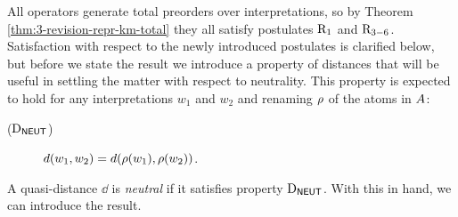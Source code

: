 All operators generate total preorders over interpretations,
so by Theorem \ref{thm:3-revision-repr-km-total}
they all satisfy postulates $\mathrm{R}_{1}$ and $\mathrm{R}_{3-6}$.
Satisfaction with respect to the newly introduced postulates 
is clarified below, but before we state the result 
we introduce a property of distances that will be useful 
in settling the matter with respect to neutrality.
This property is expected to hold for any interpretations $w_1$ and $w_2$
and renaming $\rho$ of the atoms in $A$:

\begin{description}
	\item[($\mathrm{D}_{\mathsf{NEUT}}$)] $d(w_1,w_2)=d(\rho(w_1), \rho(w_2))$.
\end{description}

A quasi-distance $\dd$ is \textit{neutral} if it satisfies property $\mathrm{D}_{\mathsf{NEUT}}$.
With this in hand, we can introduce the result.

